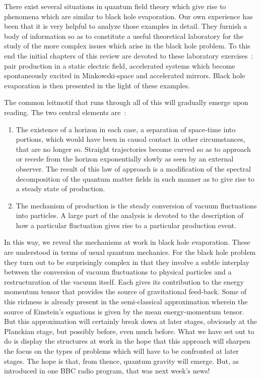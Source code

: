 \documentclass[12pt,oneside]{report}
\begin{document}
\par There exist several situations in quantum field theory
which give rise to phenomena which are similar to black hole
evaporation.  Our own experience has been that it is
very helpful to analyze those examples in detail.
They furnish a body of information so as to constitute a useful
theoretical laboratory for the study of the more complex
issues which arise in the black hole problem.  To this end the
initial chapters of this review are devoted to these laboratory
exercises~: pair production in a static electric field, accelerated
systems which become spontaneously excited in Minkowski-space
and accelerated mirrors.  
 Black hole evaporation
is then presented in the light of these examples.
\par The common leitmotif that runs through all of this will
gradually emerge upon reading.  The two central elements are~:
\begin{enumerate}
\renewcommand{\labelenumi}{\arabic{enumi})}
\item The existence of a horizon in each case, a separation of
space-time into portions, which would have been in causal contact
in other circumstances, that are no longer so. Straight
trajectories become curved so as to approach or recede from
the horizon exponentially  slowly as seen by an external
observer.  The result of this law of approach is a
modification of the spectral decomposition of the 
quantum matter fields in such manner as to
give rise to a steady state of production. 
\item The
mechanism of production is the steady conversion of vacuum
fluctuations into particles.  A large part of the analysis
is devoted to the description of how a particular
fluctuation gives rise to a particular production event.
\end{enumerate} 
\par In this way, we reveal the mechanisms
at work 
in black hole evaporation.
These are understood in terms of usual quantum mechanics.
For the black hole problem they turn out to be
surprisingly complex in that they involve
a subtle interplay between the conversion of vacuum
fluctuations to physical particles and a restructuration
of the vacuum itself. Each gives its contribution to the
energy momentum tensor that provides the source of gravitational
feed-back.  Some of this richness is already present in the semi-classical
approximation 
wherein the source of Einstein's equations is given by the mean 
energy-momentum tensor.
But this approximation will certainly break 
down at later stages, obviously at
the Planckian stage, but possibly before, even much before.
 What we have set out to
do is display the structures at work in the hope that this
approach will sharpen the focus on the types of problems
which will have to be confronted at later stages.
The hope is that, from thence, quantum gravity will emerge.
But, as introduced in one BBC radio program, that was next week's news!
\end{document}
